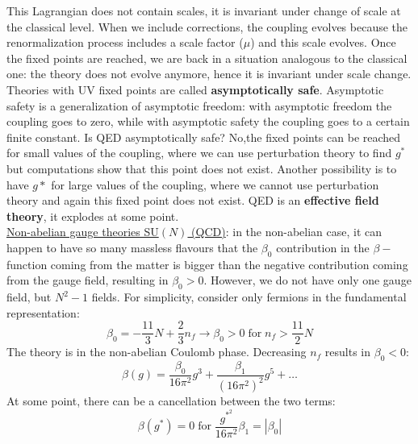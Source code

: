 \documentclass[../main.tex]{subfiles}
\begin{document}
This Lagrangian does not contain scales, it is invariant under change of scale at the classical level. When we include corrections, the coupling evolves because the renormalization process includes a scale factor ($\mu$) and this scale evolves. Once the fixed points are reached, we are back in a situation analogous to the classical one: the theory does not evolve anymore, hence it is invariant under scale change. Theories with UV fixed points are called \textbf{asymptotically safe}. Asymptotic safety is a generalization of asymptotic freedom: with asymptotic freedom the coupling goes to zero, while with asymptotic safety the coupling goes to a certain finite constant. Is QED asymptotically safe? No,the fixed points can be reached for small values of the coupling, where we can use perturbation theory to find $g^*$ but computations show that this point does not exist. Another possibility is to have $g*$ for large values of the coupling, where we cannot use perturbation theory and again this fixed point does not exist. QED is an \textbf{effective field theory}, it explodes at some point.\\
\underline{Non-abelian gauge theories SU$(N)$ (QCD)}: in the non-abelian case, it can happen to have so many massless flavours that the $\beta_0$ contribution in the $\beta-$function coming from the matter is bigger than the negative contribution coming from the gauge field, resulting in $\beta_0>0$. However, we do not have only one gauge field, but $N^2-1$ fields. For simplicity, consider only fermions in the fundamental representation:
\[
\beta_0=-\frac{11}{3}N+\frac{2}{3}n_f\to\beta_0>0 \;\text{for}\;n_f>\frac{11}{2}N
\]
The theory is in the non-abelian Coulomb phase. Decreasing $n_f$ results in $\beta_0<0$:
\[
\beta(g)=\frac{\beta_0}{16\pi^2}g^3+\frac{\beta_1}{(16\pi^2)^2}g^5+\dots
\]
At some point, there can be a cancellation between the two terms:
\[
\beta(g^*)=0 \;\text{for}\;\frac{g^*^2}{16\pi^2}\beta_1=|\beta_0|
\]
\end{document}
